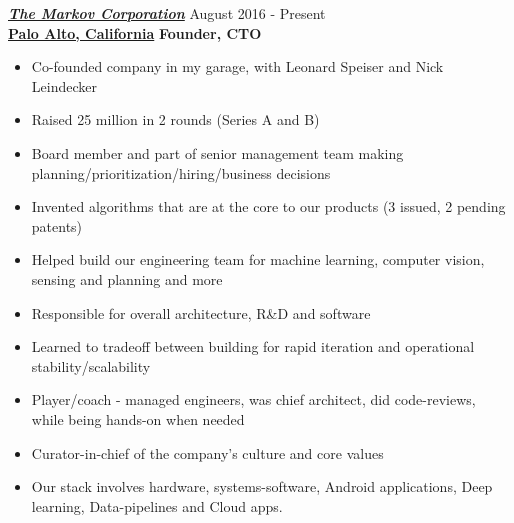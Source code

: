 \vspace{8pt}
{\sl \href{http://www.markovcorp.com}{\textbf{The Markov Corporation}}} \hfill        August 2016 - Present \\
\href{http://www.markovcorp.com}{\textbf{Palo Alto, California}}       \hfill   \textbf{Founder, CTO}
   \begin{itemize} \itemsep -2pt %
   \item Co-founded company in my garage, with Leonard Speiser and Nick Leindecker
   \item Raised 25 million in 2 rounds (Series A and B)
   \item Board member and part of senior management team making planning/prioritization/hiring/business decisions
   \item Invented algorithms that are at the core to our products (3 issued, 2 pending patents)
   \item Helped build our engineering team for machine learning, computer vision, sensing and planning and more
   \item Responsible for overall architecture, R\&D and software
   \item Learned to tradeoff between building for rapid iteration and operational stability/scalability
   \item Player/coach - managed engineers, was chief architect, did code-reviews, while being hands-on when needed
   \item Curator-in-chief of the company's culture and core values
   \item Our stack involves hardware, systems-software, Android applications, Deep learning, Data-pipelines and Cloud apps.
\end{itemize}


